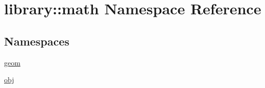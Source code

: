 \hypertarget{namespacelibrary_1_1math}{}\section{library\+:\+:math Namespace Reference}
\label{namespacelibrary_1_1math}
\subsection*{Namespaces}
\begin{DoxyCompactItemize}
\item 
 \hyperlink{namespacelibrary_1_1math_1_1geom}{geom}
\item 
 \hyperlink{namespacelibrary_1_1math_1_1obj}{obj}
\end{DoxyCompactItemize}
